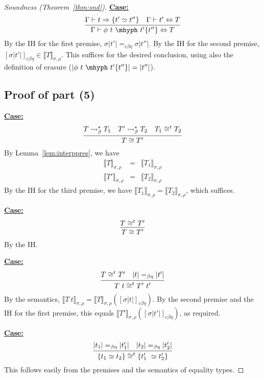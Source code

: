 \documentclass{article}
\newcommand{\interp}[1]{\llbracket #1 \rrbracket}
\newcommand{\tpsynth}[0]{\Rightarrow}
\newcommand{\cbe}[0]{c\beta\eta}
\newcommand{\startcase}[1]{\vspace{#1} \noindent\textbf{\underline{Case:}}}
\begin{document}
\begin{proof}[Soundness (Theorem~\ref{thm:snd})]
\startcase{.2cm}
\[
    \infer{\Gamma\vdash \phi\ t\ \mhyph\ t'\{t''\} \Leftrightarrow T}
          {\Gamma\vdash t\tpsynth \{t'\simeq t''\} & \Gamma\vdash t' \Leftrightarrow T}  
\]
By the IH for the first premise, $\sigma|t'| =_{\cbe} \sigma|t''|$.  By the IH for the second
premise, $[\sigma|t'|]_{\cbe}\in\interp{T}_{\sigma,\rho}$.  This suffices for the desired conclusion,
using also the definition of erasure ($|\phi\ t\ \mhyph\ t'\{t''\}| = |t''|$).

\subsection*{Proof of part (5) }



\startcase{.2cm}
\[
    \infer{T \cong T'}{T \leadsto^*_\beta T_1 & T' \leadsto^*_\beta T_2 & T_1\cong^t T_2}  
\]
By Lemma~\ref{lem:interppres}, we have
\[
\begin{array}{lll}
  \interp{T}_{\sigma,\rho} & = & \interp{T_1}_{\sigma,\rho}\\
  \interp{T'}_{\sigma,\rho} & = & \interp{T_2}_{\sigma,\rho}
\end{array}
\]
By the IH for the third premise, we have $\interp{T_1}_{\sigma,\rho} = \interp{T_2}_{\sigma,\rho}$,
which suffices.

\startcase{.2cm}
\[
    \infer{T \cong T'}{T \cong^t T'} 
\]
By the IH.

\startcase{.2cm}
\[
    \infer{T\ t \cong^t T'\ t'}{T \cong^t T' & |t| =_{\beta\eta} |t'|}
\]
By the semantics, $\interp{T\ t}_{\sigma,\rho} =
\interp{T}_{\sigma,\rho}([\sigma|t|]_{\cbe})$.  By the second premise
and the IH for the first premise, this equals
$\interp{T'}_{\sigma,\rho}([\sigma|t'|]_{\cbe})$, as required.

\startcase{.2cm}
\[
    \infer{\{ t_1 \simeq t_2 \} \cong^t \{ t_1'\ \simeq t_2' \}}{|t_1| =_{\beta\eta} |t_1'| & |t_2| =_{\beta\eta} |t_2'|}
\]
This follows easily from the premises and the semantics of equality types.

\end{proof}
\end{document}
